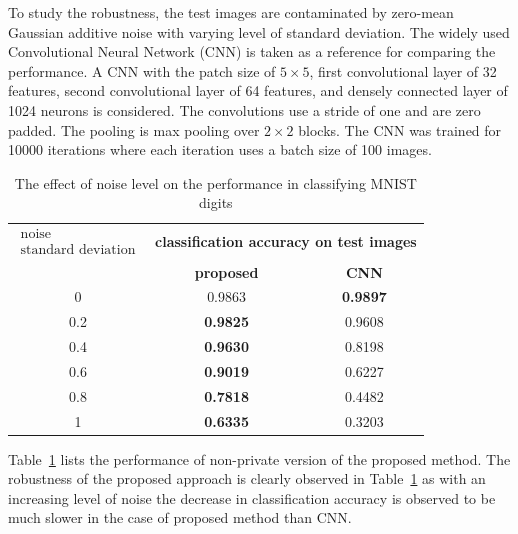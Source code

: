 To study the robustness, the test images are contaminated by zero-mean Gaussian additive noise with varying level of standard deviation. The widely used Convolutional Neural Network (CNN) is taken as a reference for comparing the performance. A CNN with the patch size of $5 \times 5$, first convolutional layer of 32 features, second convolutional layer of 64 features, and densely connected layer of 1024 neurons is considered. The convolutions use a stride of one and are zero padded. The pooling is max pooling over $2\times2$ blocks. The CNN was trained for 10000 iterations where each iteration uses a batch size of 100 images. 
\begin{table}
\renewcommand{\arraystretch}{1.3}
\caption{The effect of noise level on the performance in classifying MNIST digits}
\label{table_robustness_results} \centering
\begin{tabular}{c||*{2}{c}}
\hline
\bfseries $\begin{array}{c} \mbox{noise} \\ \mbox{standard deviation} \end{array}$ & \multicolumn{2}{c}{\bfseries classification accuracy on test images}  \\
\cline{2-3} 
 & \bfseries proposed  &    \bfseries CNN  \\ 
\hline \hline  
0 & 0.9863    & \textbf{0.9897}  \\
0.2 &   \textbf{0.9825}   & 0.9608  \\ 
0.4 & \textbf{0.9630}  & 0.8198 \\ 
0.6 & \textbf{0.9019}   & 0.6227  \\ 
0.8 & \textbf{0.7818}  & 0.4482  \\
1 & \textbf{0.6335}  & 0.3203 \\
\hline \hline
\end{tabular}
\end{table} 

Table~\ref{table_robustness_results} lists the performance of non-private version of the proposed method. The robustness of the proposed approach is clearly observed in Table~\ref{table_robustness_results} as with an increasing level of noise the decrease in classification accuracy is observed to be much slower in the case of proposed method than CNN. 

